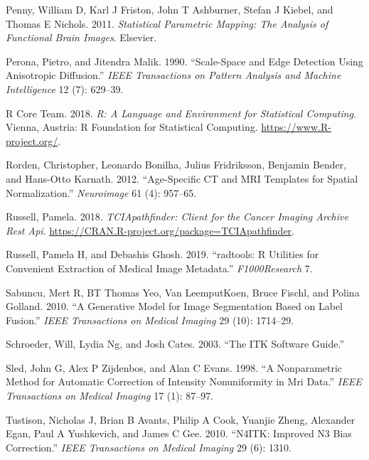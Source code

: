 \documentclass[]{elsarticle} %
\begin{document}
\leavevmode\hypertarget{ref-spm}{}%
Penny, William D, Karl J Friston, John T Ashburner, Stefan J Kiebel, and Thomas E Nichols. 2011. \emph{Statistical Parametric Mapping: The Analysis of Functional Brain Images}. Elsevier.

\leavevmode\hypertarget{ref-peronamalik}{}%
Perona, Pietro, and Jitendra Malik. 1990. ``Scale-Space and Edge Detection Using Anisotropic Diffusion.'' \emph{IEEE Transactions on Pattern Analysis and Machine Intelligence} 12 (7): 629--39.

\leavevmode\hypertarget{ref-R}{}%
R Core Team. 2018. \emph{R: A Language and Environment for Statistical Computing}. Vienna, Austria: R Foundation for Statistical Computing. \url{https://www.R-project.org/}.

\leavevmode\hypertarget{ref-rorden2012age}{}%
Rorden, Christopher, Leonardo Bonilha, Julius Fridriksson, Benjamin Bender, and Hans-Otto Karnath. 2012. ``Age-Specific CT and MRI Templates for Spatial Normalization.'' \emph{Neuroimage} 61 (4): 957--65.

\leavevmode\hypertarget{ref-TCIApathfinder}{}%
Russell, Pamela. 2018. \emph{TCIApathfinder: Client for the Cancer Imaging Archive Rest Api}. \url{https://CRAN.R-project.org/package=TCIApathfinder}.

\leavevmode\hypertarget{ref-radtools}{}%
Russell, Pamela H, and Debashis Ghosh. 2019. ``radtools: R Utilities for Convenient Extraction of Medical Image Metadata.'' \emph{F1000Research} 7.

\leavevmode\hypertarget{ref-sabuncu2010generative}{}%
Sabuncu, Mert R, BT Thomas Yeo, Van LeemputKoen, Bruce Fischl, and Polina Golland. 2010. ``A Generative Model for Image Segmentation Based on Label Fusion.'' \emph{IEEE Transactions on Medical Imaging} 29 (10): 1714--29.

\leavevmode\hypertarget{ref-itk}{}%
Schroeder, Will, Lydia Ng, and Josh Cates. 2003. ``The ITK Software Guide.''

\leavevmode\hypertarget{ref-sled1998nonparametric}{}%
Sled, John G, Alex P Zijdenbos, and Alan C Evans. 1998. ``A Nonparametric Method for Automatic Correction of Intensity Nonuniformity in Mri Data.'' \emph{IEEE Transactions on Medical Imaging} 17 (1): 87--97.

\leavevmode\hypertarget{ref-n4}{}%
Tustison, Nicholas J, Brian B Avants, Philip A Cook, Yuanjie Zheng, Alexander Egan, Paul A Yushkevich, and James C Gee. 2010. ``N4ITK: Improved N3 Bias Correction.'' \emph{IEEE Transactions on Medical Imaging} 29 (6): 1310.
\end{document}
